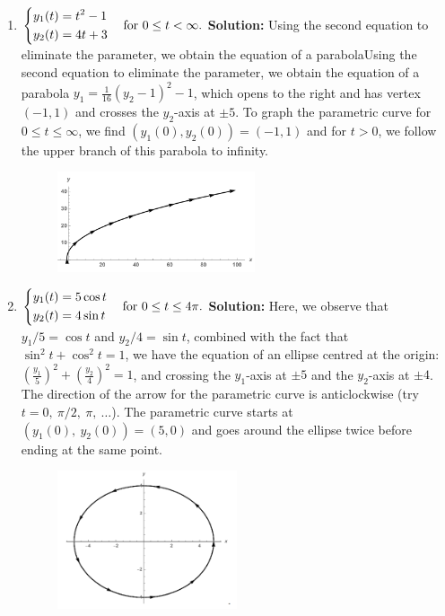 \documentclass[11pt,a4paper]{article}
\begin{document}
\begin{enumerate}[\bfseries A.]
\begin{enumerate}[\bfseries 1)]
			\item $
			\begin{dcases}
				y_1(t) = t^2 - 1\\
				y_2(t) = 4t + 3
			\end{dcases}\quad
			\text{for $0 \leq t < \infty$.}
			$
			\textbf{Solution:} Using the second equation to eliminate the parameter, we obtain the equation of a parabolaUsing the second equation to eliminate the parameter, we obtain the equation of a parabola $y_1 = \frac{1}{16}(y_2-1)^2-1$, which opens to the right and has vertex $(−1, 1)$ and crosses the $y_2$-axis at $\pm 5$. To graph the parametric curve for $0 \leq t \leq \infty$, we find $(y_1(0), y_2(0)) = (−1, 1)$ and for $t > 0$, we follow the upper branch of this parabola to infinity.
			\begin{figure}[H]
				\centering
					\includegraphics[width=0.55\textwidth]{figure/figA2.PNG}
			\end{figure}
			\item $
			\begin{dcases}
				y_1(t) = 5\cos t\\
				y_2(t) = 4\sin t
			\end{dcases}\quad
			\text{for $0 \leq t \leq 4\pi$.}
			$
			\textbf{Solution:}  Here, we observe that $y_1/5 = \cos t$ and $y_2/4 = \sin t$, combined with the fact that $\sin^2t + \cos^2t=1$, we have the equation of an ellipse centred at the origin: $(\frac{y_1}{5})^2+(\frac{y_2}{4})^2 = 1$, and crossing the $y_1$-axis at $\pm 5$ and the $y_2$-axis at $\pm 4$. The direction of the arrow for the parametric curve is anticlockwise (try $t = 0,\ \pi/2,\ \pi,\ \ldots$). The parametric curve starts at $(y_1(0),\ y_2(0)) = (5, 0)$ and goes around the ellipse twice before ending at the same point.
			\begin{figure}[H]
				\centering
					\includegraphics[width=0.5\textwidth]{figure/figA3.PNG}

\end{figure}
\end{enumerate}
\end{enumerate}
\end{document}
